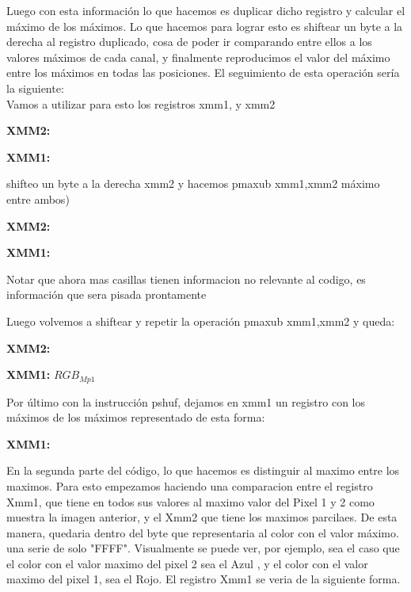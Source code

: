  Luego con esta información lo que hacemos es duplicar dicho registro y calcular el máximo de los máximos. Lo que hacemos para lograr esto es shiftear un byte a la derecha al registro duplicado, cosa de poder ir comparando entre ellos a los valores máximos de cada canal, y finalmente reproducimos el valor del máximo entre los máximos en todas las posiciones. El seguimiento de esta operación sería la siguiente: 
\\Vamos a utilizar para esto los registros xmm1, y xmm2

\par{\textbf{XMM2:}}
\par{\textbf{XMM1:}}
\par{shifteo un byte a la derecha xmm2 y hacemos pmaxub xmm1,xmm2  máximo entre ambos)}
\par{\textbf{XMM2:}}

\par{\textbf{XMM1:}}
\par {Notar que ahora mas casillas tienen informacion no relevante al codigo, es información que sera pisada prontamente}
\par{Luego volvemos a shiftear y repetir la operación pmaxub xmm1,xmm2  y queda: }

\par{\textbf{XMM2:}}

\par{\textbf{XMM1:}}
{{\scriptsize $RGB_{Mp1}$}}
\par{Por último con la instrucción pshuf, dejamos en xmm1 un registro con los máximos de los máximos representado de esta forma: }
\par{\textbf{XMM1:}}

	 En la segunda parte del código, lo que hacemos es distinguir al maximo entre los maximos. Para esto empezamos haciendo una comparacion entre el registro Xmm1, que tiene en todos sus valores al maximo valor del Pixel 1 y 2 como muestra la imagen anterior, y  el Xmm2 que tiene los maximos parcilaes. De esta manera, quedaria dentro del byte que representaria al color con el valor máximo. una serie de solo "FFFF". Visualmente se puede ver, por ejemplo, sea el caso que el color con el valor maximo del pixel 2 sea el Azul , y el color con el valor maximo del pixel 1, sea el Rojo. El registro Xmm1 se veria de la siguiente forma. 
	 
